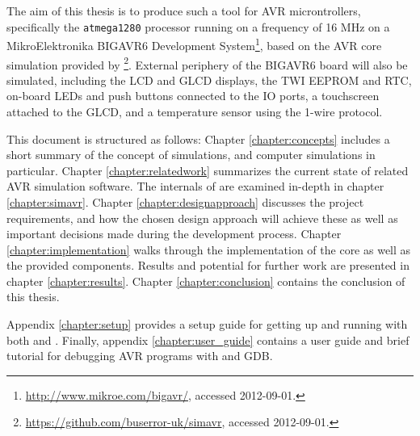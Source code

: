 The aim of this thesis is to produce such a tool for \ac{AVR} microntrollers,
specifically the \verb|atmega1280| processor running on a frequency of 16 \ac{MHz}
on a MikroElektronika BIGAVR6 Development System\footnote{
%
\url{http://www.mikroe.com/bigavr/}, accessed 2012-09-01.
%
}, based on the \ac{AVR} core simulation provided by \simavr\footnote{
%
\url{https://github.com/buserror-uk/simavr}, accessed 2012-09-01.
%
}. External periphery of the BIGAVR6 board will also be simulated, including
the \ac{LCD} and \ac{GLCD} displays, the \ac{TWI} \ac{EEPROM} and \ac{RTC},
on-board \acp{LED} and push buttons connected to the \ac{IO} ports, a touchscreen
attached to the \ac{GLCD}, and a temperature sensor using the 1-wire protocol.

This document is structured as follows:
Chapter \ref{chapter:concepts} includes a short summary of the concept of simulations,
and computer simulations in particular.
Chapter \ref{chapter:relatedwork} summarizes the current state of related \ac{AVR}
simulation software.
The internals of \simavr are examined in-depth in chapter \ref{chapter:simavr}.
Chapter \ref{chapter:designapproach} discusses the project requirements, and
how the chosen design approach will achieve these as well as important decisions
made during the development process.
Chapter \ref{chapter:implementation} walks through the implementation of the
\qsimavr core as well as the provided components.
Results and potential for further work are presented in chapter \ref{chapter:results}.
Chapter \ref{chapter:conclusion} contains the conclusion of this thesis.

Appendix \ref{chapter:setup} provides a setup guide for getting up and running
with both \simavr and \qsimavr.
Finally, appendix \ref{chapter:user_guide} contains a \qsimavr user guide
and brief tutorial for debugging \ac{AVR} programs with \qsimavr and \ac{GDB}.

